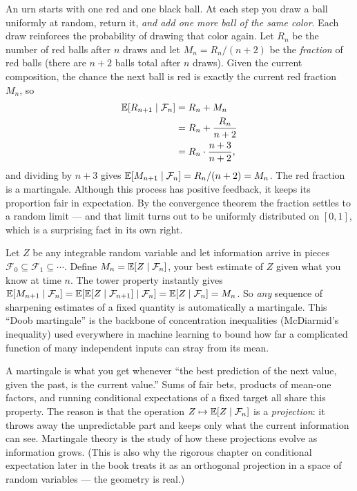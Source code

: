 \begin{example}
\label{ch28:ex-polya}
An urn starts with one red and one black ball. At each step you draw a ball uniformly at random,
return it, \emph{and add one more ball of the same color}. Each draw reinforces the probability of drawing that color again. Let $R_n$ be the number of
red balls after $n$ draws and let $M_n = R_n / (n+2)$ be the \emph{fraction} of red balls (there are
$n+2$ balls total after $n$ draws). Given the current composition, the chance the next ball is red is
exactly the current red fraction $M_n$, so
\begin{align*}
  \operatorname{\mathbb{E}}[R_{n+1}\mid\mathcal{F}_n] &= R_n + M_n \\
  &= R_n + \frac{R_n}{n+2} \\
  &= R_n \cdot \frac{n+3}{n+2},
\end{align*}
and dividing by $n+3$ gives $\operatorname{\mathbb{E}}[M_{n+1}\mid\mathcal{F}_n] = R_n/(n+2) = M_n$. The red fraction is a
martingale. Although this process has positive feedback, it keeps its proportion fair in expectation. By the convergence theorem the fraction settles to a random limit
--- and that limit turns out to be uniformly distributed on $[0,1]$, which is a surprising fact in its own right.
\end{example}

\begin{example}
\label{ch28:ex-doob}
Let $Z$ be any integrable random variable and let information arrive in pieces $\mathcal{F}_0 \subseteq
\mathcal{F}_1 \subseteq \cdots$. Define $M_n = \operatorname{\mathbb{E}}[Z \mid \mathcal{F}_n]$, your best estimate of $Z$
given what you know at time $n$. The tower property instantly gives
$\operatorname{\mathbb{E}}[M_{n+1}\mid\mathcal{F}_n] = \operatorname{\mathbb{E}}[\operatorname{\mathbb{E}}[Z\mid\mathcal{F}_{n+1}]\mid\mathcal{F}_n]
= \operatorname{\mathbb{E}}[Z\mid\mathcal{F}_n] = M_n$. So \emph{any} sequence of sharpening estimates of a fixed quantity
is automatically a martingale. This ``Doob martingale'' is the backbone of concentration inequalities
(McDiarmid's inequality) used everywhere in machine learning to bound how far a complicated function of
many independent inputs can stray from its mean.
\end{example}

\begin{happeningbox}
A martingale is what you get whenever ``the best prediction of the next value, given the past, is the current value.'' Sums of fair bets, products of mean-one factors, and
running conditional expectations of a fixed target all share this property. The reason is that the
operation $Z \mapsto \operatorname{\mathbb{E}}[Z\mid\mathcal{F}_n]$ is a \emph{projection}: it throws away the
unpredictable part and keeps only what the current information can see. Martingale theory is the study of
how these projections evolve as information grows. (This is also why the rigorous chapter on
conditional expectation later in the book treats it as an orthogonal projection in a space of random
variables --- the geometry is real.)
\end{happeningbox}

